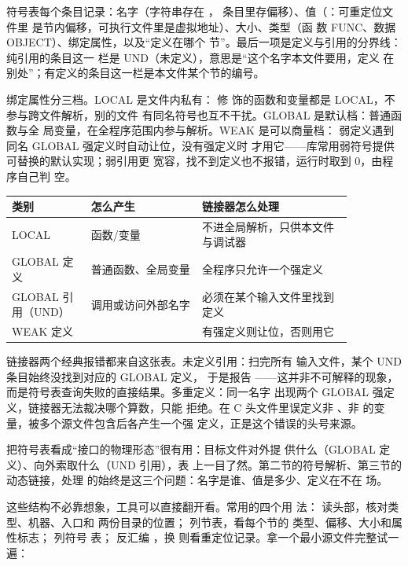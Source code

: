 符号表每个条目记录：名字（字符串存在 ，
条目里存偏移）、值（：可重定位文件里
是节内偏移，可执行文件里是虚拟地址）、大小、类型（函
数 FUNC、数据 OBJECT）、绑定属性，以及“定义在哪个
节”。最后一项是定义与引用的分界线：纯引用的条目这一
栏是 UND（未定义），意思是“这个名字本文件要用，定义
在别处”；有定义的条目这一栏是本文件某个节的编号。

绑定属性分三档。LOCAL 是文件内私有： 修
饰的函数和变量都是 LOCAL，不参与跨文件解析，别的文件
有同名符号也互不干扰。GLOBAL 是默认档：普通函数与全
局变量，在全程序范围内参与解析。WEAK 是可以商量档：
弱定义遇到同名 GLOBAL 强定义时自动让位，没有强定义时
才用它——库常用弱符号提供可替换的默认实现；弱引用更
宽容，找不到定义也不报错，运行时取到 0，由程序自己判
空。

\begin{longtable}{L{0.2\linewidth}L{0.28\linewidth}L{0.38\linewidth}}
\toprule
类别 & 怎么产生 & 链接器怎么处理 \\
\midrule
LOCAL &  函数/变量 & 不进全局解析，只供本文件与调试器 \\\tablerowrule
GLOBAL 定义 & 普通函数、全局变量 & 全程序只允许一个强定义 \\\tablerowrule
GLOBAL 引用（UND） & 调用或访问外部名字 & 必须在某个输入文件里找到定义 \\\tablerowrule
WEAK 定义 &  & 有强定义则让位，否则用它 \\
\bottomrule
\end{longtable}

链接器两个经典报错都来自这张表。未定义引用：扫完所有
输入文件，某个 UND 条目始终没找到对应的 GLOBAL 定义，
于是报告 ——这并非不可解释的现象，而是符号表查询失败的直接结果。多重定义：同一名字
出现两个 GLOBAL 强定义，链接器无法裁决哪个算数，只能
拒绝。在 C 头文件里误定义非 、非
 的变量，被多个源文件包含后各产生一个强
定义，正是这个错误的头号来源。

把符号表看成“接口的物理形态”很有用：目标文件对外提
供什么（GLOBAL 定义）、向外索取什么（UND 引用），表
上一目了然。第二节的符号解析、第三节的动态链接，处理
的始终是这三个问题：名字是谁、值是多少、定义在不在
场。

这些结构不必靠想象，工具可以直接翻开看。常用的四个用
法： 读头部，核对类型、机器、入口和
两份目录的位置； 列节表，看每个节的
类型、偏移、大小和属性标志； 列符号
表； 反汇编 ，换
 则看重定位记录。拿一个最小源文件完整试一
遍：

